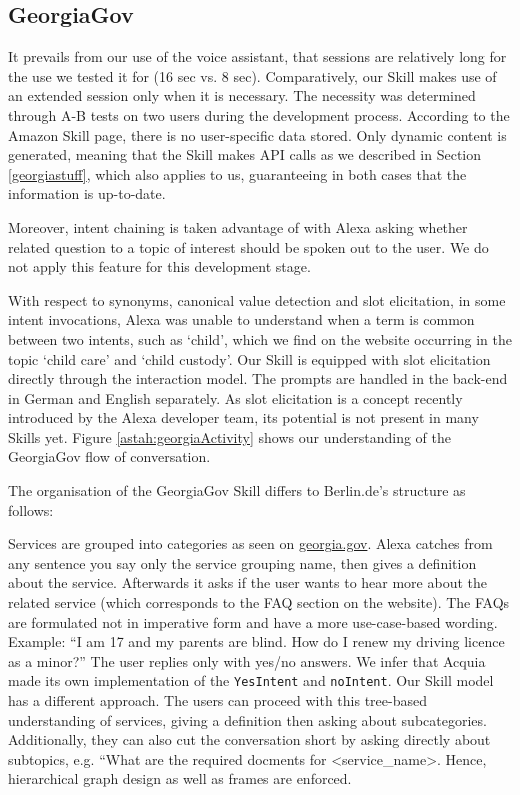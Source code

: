 \subsection*{GeorgiaGov}


It prevails from our use of the voice assistant, that sessions are relatively long for the use we tested it for (16 sec vs. 8 sec). Comparatively, our Skill makes use of an extended session only when it is necessary. The necessity was determined through A-B tests on two users during the development process. %
According to the Amazon Skill page, there is no user-specific data stored. Only dynamic content is generated, meaning that the Skill makes API calls as we described in Section \ref{georgiastuff}, which also applies to us, guaranteeing in both cases that the information is up-to-date. 

Moreover, intent chaining is taken advantage of with Alexa asking whether related question to a topic of interest should be spoken out to the user. We do not apply this feature for this development stage.

With respect to synonyms, canonical value detection and slot elicitation, in some intent invocations, Alexa was unable to understand when a term is common between two intents, such as `child', which we find on the website occurring in the topic `child care' and `child custody'. Our Skill is equipped with slot elicitation directly through the interaction model. The prompts are handled in the back-end in German and English separately. As slot elicitation is a concept recently introduced by the Alexa developer team, its potential is not present in many Skills yet. Figure \ref{astah:georgiaActivity} shows our understanding of the GeorgiaGov flow of conversation.





The organisation of the GeorgiaGov Skill differs to Berlin.de's structure as follows:

Services are grouped into categories as seen on \href{http://www.georgia.gov}{georgia.gov}.
Alexa catches from any sentence you say only the service grouping name, then gives a definition about the service. Afterwards it asks if the user wants to hear more about the related service (which corresponds to the FAQ section on the website). The FAQs are formulated not in imperative form and have a more use-case-based wording. Example: ``I am 17 and my parents are blind. How do I renew my driving licence as a minor?''  The user replies only with yes/no answers. We infer that Acquia made its own implementation of the \texttt{YesIntent} and \texttt{noIntent}. Our Skill model has a different approach. The users can proceed with this tree-based understanding of services, giving a definition then asking about subcategories. Additionally, they can also cut the conversation short by asking directly about subtopics, e.g. ``What are the required docments for \textless service\_name\textgreater. Hence, hierarchical graph design as well as frames are enforced. 

